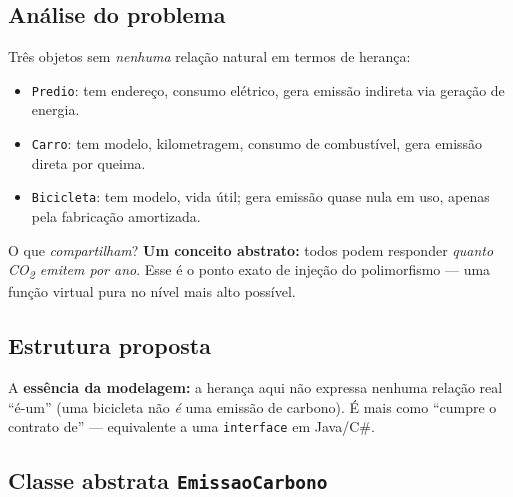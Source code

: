 \documentclass[11pt,a4paper]{article}
\begin{document}
\subsection*{An\'alise do problema}

Tr\^es objetos sem \emph{nenhuma} rela\c{c}\~ao natural em termos de heran\c{c}a:

\begin{itemize}[leftmargin=*,itemsep=0pt]
  \item \texttt{Predio}: tem endere\c{c}o, consumo el\'etrico, gera emiss\~ao indireta via gera\c{c}\~ao de energia.
  \item \texttt{Carro}: tem modelo, kilometragem, consumo de combust\'ivel, gera emiss\~ao direta por queima.
  \item \texttt{Bicicleta}: tem modelo, vida \'util; gera emiss\~ao quase nula em uso, apenas pela fabrica\c{c}\~ao amortizada.
\end{itemize}

O que \emph{compartilham}? \textbf{Um conceito abstrato:} todos podem responder \emph{quanto CO\textsubscript{2} emitem por ano}. Esse \'e o ponto exato de inje\c{c}\~ao do polimorfismo --- uma fun\c{c}\~ao virtual pura no n\'ivel mais alto poss\'ivel.

\subsection*{Estrutura proposta}

\begin{center}
\end{center}

A \textbf{ess\^encia da modelagem:} a heran\c{c}a aqui n\~ao expressa nenhuma rela\c{c}\~ao real ``\'e-um'' (uma bicicleta n\~ao \emph{\'e} uma emiss\~ao de carbono). \'E mais como ``cumpre o contrato de'' --- equivalente a uma \texttt{interface} em Java/C\#.

\subsection*{Classe abstrata \texttt{EmissaoCarbono}}
\end{document}
